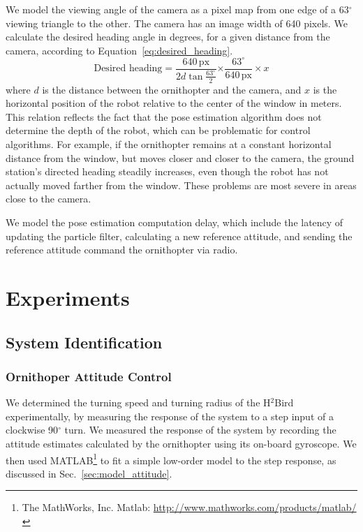 \documentclass{aamas2013}
\begin{document}
We model the viewing angle of the camera as a pixel map from one edge of a 
63$^{\circ}$ viewing triangle to the other. The camera has an image width of 
640 pixels. We calculate the desired heading angle in degrees, for a given 
distance from the camera, according to Equation~\ref{eq:desired_heading}.
\begin{equation} 
\label{eq:desired_heading} 
\text{Desired heading} = \frac{640\,\text{px}}{2d\tan{\frac{63^{\circ}}{2}}}{\times\frac{63^{\circ}}{640\,\text{px}}\times x}
\end{equation}
where $d$ is the distance between the ornithopter and the camera, and $x$ is 
the horizontal position of the robot relative to the center of the window in 
meters. This relation reflects the fact that the pose estimation algorithm 
does not determine the depth of the robot, which can be problematic for 
control algorithms. For example, if the ornithopter remains at a constant 
horizontal distance from the window, but moves closer and closer to the 
camera, the ground station's directed heading steadily increases, even 
though the robot has not actually moved farther from the window. These 
problems are most severe in areas close to the camera.

We model the pose estimation computation delay, which include the latency of 
updating the particle filter, calculating a new reference attitude, and 
sending the reference attitude command the ornithopter via radio.

\section{Experiments}

\subsection{System Identification}

\subsubsection{Ornithoper Attitude Control}
We determined the turning speed and turning radius of the H$^2$Bird 
experimentally, by measuring the response of the system to a step input of a 
clockwise 90$^{\circ}$ turn. We measured the response of the system by 
recording the attitude estimates calculated by the ornithopter using its 
on-board gyroscope. We then used MATLAB\footnote{The MathWorks, Inc. Matlab:
\href{http://www.mathworks.com/products/matlab/}
     {http://www.mathworks.com/products/matlab/}} 
to fit a simple low-order model to the step response, as discussed in 
Sec.~\ref{sec:model_attitude}.
\end{document}
